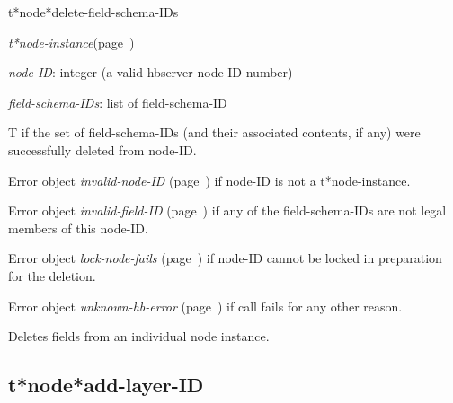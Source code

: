 \begin{description}
\item [Name:]  t*node*delete-field-schema-IDs

\item [Class:] {\sl t*node-instance}\hfill(page~\pageref{t*node-instance})

\item [Parameters:]
\item {\sl node-ID}:  
integer (a valid hbserver node ID number)

\item {\sl field-schema-IDs}:  list of field-schema-ID


\item [Return-value:]
T if the set of field-schema-IDs (and their associated
contents, if any) were successfully deleted from node-ID.

Error object {\sl invalid-node-ID} (page~\pageref{invalid-node-ID}) if node-ID is not
a t*node-instance.

Error object {\sl invalid-field-ID} (page~\pageref{invalid-field-ID}) if any of the 
field-schema-IDs are not legal members of this
node-ID.

Error object {\sl lock-node-fails} (page~\pageref{lock-node-fails}) if node-ID cannot
be locked in preparation for the deletion. 

Error object {\sl unknown-hb-error} (page~\pageref{unknown-hb-error}) if call fails
for any other reason.

\item [Description:]

Deletes fields from an individual node instance. 

\item [Public:]



\end{description}
\horizontalline

\subsection{t*node*add-layer-ID}
\label{t*node*add-layer-ID}

